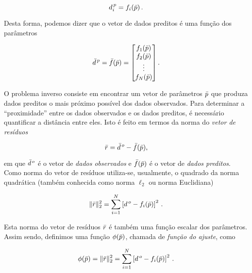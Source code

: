 \begin{equation}
d^{\thinspace p}_i = f_i(\bar{p})\thinspace.
\label{eq:fi}
\end{equation}

\noindent Desta forma, podemos dizer que o vetor de dados preditos é uma função
dos parâmetros

\begin{equation}
\bar{d}^{\thinspace p}= \bar{f}(\bar{p}) =
    \begin{bmatrix}
    f_1(\bar{p}) \\
    f_2(\bar{p}) \\
    \vdots \\
    f_N(\bar{p})
    \end{bmatrix}.
\label{eq:dados_preditos}
\end{equation}

\indent O problema inverso consiste em encontrar um vetor de parâmetros $\bar{p}$
que produza dados preditos o mais próximo possível dos dados observados.
Para determinar a ``proximidade'' entre os dados observados e os dados preditos,
é necessário quantificar a distância entre eles.
Isto é feito em termos da norma do {\it vetor de resíduos}

\begin{equation}
\bar{r} = \bar{d}^{\thinspace o} - \bar{f}(\bar{p}),
\end{equation}

\noindent em que $\bar{d}^{\thinspace o}$ é o vetor de {\it dados observados}
e $\bar{f}(\bar{p})$ é o vetor de {\it dados preditos}.
\\
\indent Como norma do vetor de resíduos utiliza-se, usualmente, o quadrado da
norma quadrática (também conhecida como norma $\ell_2$ ou norma Euclidiana)

\begin{equation}
\lVert\bar{r}\rVert_2^2 =
    \sum\limits_{i=1}^N \left[d^{\thinspace o} - f_i(\bar{p})\right]^2 \, .
\label{eq:norma_l2}
\end{equation}

\noindent Esta norma do vetor de resíduos $\bar{r}$ é também uma função escalar
dos parâmetros. Assim sendo, definimos uma função $\phi(\bar{p})$, chamada de
{\it função do ajuste}, como

\begin{equation}
\phi(\bar{p}) = \lVert\bar{r}\rVert_2^2 =
    \sum\limits_{i=1}^N \left[d^{\thinspace o} - f_i(\bar{p})\right]^2 \, .
\label{eq:ajuste_sum}
\end{equation}

